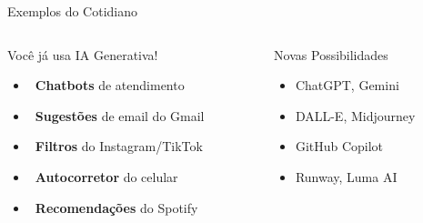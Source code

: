 \documentclass[aspectratio=169,12pt]{beamer}
\begin{document}
\begin{frame}{Exemplos do Cotidiano}
    \begin{columns}
        \begin{column}{0.5\textwidth}
            \begin{exampleblock}{Você já usa IA Generativa!}
                \begin{itemize}
                    \item \faComments\, \textbf{Chatbots} de atendimento
                    \item \faEnvelope\, \textbf{Sugestões} de email do Gmail
                    \item \faCamera\, \textbf{Filtros} do Instagram/TikTok
                    \item \faKeyboard\, \textbf{Autocorretor} do celular
                    \item \faMusic\, \textbf{Recomendações} do Spotify
                \end{itemize}
            \end{exampleblock}
        \end{column}
        \begin{column}{0.5\textwidth}
            \begin{alertblock}{Novas Possibilidades}
                \begin{itemize}
                    \item \textcolor{accent}{\faRobot} ChatGPT, Gemini
                    \item \textcolor{secondary}{\faImage} DALL-E, Midjourney
                    \item \textcolor{success}{\faCode} GitHub Copilot
                    \item \textcolor{warning}{\faVideo} Runway, Luma AI
                \end{itemize}
            \end{alertblock}
        \end{column}
    \end{columns}
\end{frame}
\end{document}
